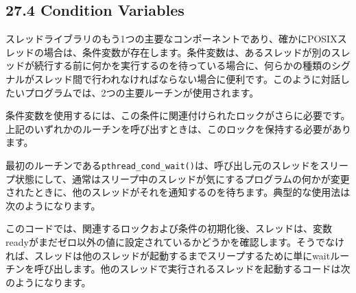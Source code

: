 \hypertarget{condition-variables}{%
\subsection*{27.4 Condition Variables}\label{condition-variables}}

スレッドライブラリのもう1つの主要なコンポーネントであり、確かにPOSIXスレッドの場合は、条件変数が存在します。条件変数は、あるスレッドが別のスレッドが続行する前に何かを実行するのを待っている場合に、何らかの種類のシグナルがスレッド間で行われなければならない場合に便利です。このように対話したいプログラムでは、2つの主要ルーチンが使用されます。

\begin{Shaded}
\begin{Highlighting}[]
\end{Highlighting}
\end{Shaded}

条件変数を使用するには、この条件に関連付けられたロックがさらに必要です。上記のいずれかのルーチンを呼び出すときは、このロックを保持する必要があります。

最初のルーチンである\texttt{pthread\_cond\_wait()}は、呼び出し元のスレッドをスリープ状態にして、通常はスリープ中のスレッドが気にするプログラムの何かが変更されたときに、他のスレッドがそれを通知するのを待ちます。典型的な使用法は次のようになります。

\begin{Shaded}
\begin{Highlighting}[]
\NormalTok{)}
\end{Highlighting}
\end{Shaded}

このコードでは、関連するロックおよび条件の初期化後、スレッドは、変数readyがまだゼロ以外の値に設定されているかどうかを確認します。そうでなければ、スレッドは他のスレッドが起動するまでスリープするために単にwaitルーチンを呼び出します。他のスレッドで実行されるスレッドを起動するコードは次のようになります。

\begin{Shaded}
\begin{Highlighting}[]
\NormalTok{;}
\end{Highlighting}
\end{Shaded}

